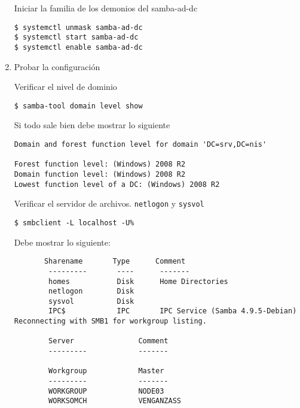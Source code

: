 \documentclass[../main.tex]{subfiles}
\begin{document}
\begin{enumerate}
        Iniciar la familia de los demonios del samba-ad-dc
        \begin{listing}[H]
\begin{verbatim}
$ systemctl unmask samba-ad-dc
$ systemctl start samba-ad-dc
$ systemctl enable samba-ad-dc
\end{verbatim}
\end{listing}


  \item Probar la configuración

        Verificar el nivel de dominio
        \begin{listing}[H]
\begin{verbatim}
$ samba-tool domain level show
\end{verbatim}
\end{listing}

        Si todo sale bien debe mostrar lo siguiente
        \begin{listing}[H]
\begin{verbatim}
Domain and forest function level for domain 'DC=srv,DC=nis'

Forest function level: (Windows) 2008 R2
Domain function level: (Windows) 2008 R2
Lowest function level of a DC: (Windows) 2008 R2
\end{verbatim}
\end{listing}

        Verificar el servidor de archivos. \texttt{netlogon}
        y \texttt{sysvol}
        \begin{listing}[H]
\begin{verbatim}
$ smbclient -L localhost -U%
\end{verbatim}
\end{listing}

        Debe mostrar lo siguiente:
        \begin{listing}[H]
\begin{verbatim}
       Sharename       Type      Comment
        ---------       ----      -------
        homes           Disk      Home Directories
        netlogon        Disk
        sysvol          Disk
        IPC$            IPC       IPC Service (Samba 4.9.5-Debian)
Reconnecting with SMB1 for workgroup listing.

        Server               Comment
        ---------            -------

        Workgroup            Master
        ---------            -------
        WORKGROUP            NODE03
        WORKSOMCH            VENGANZASS
\end{verbatim}
\end{listing}


\end{enumerate}
\end{document}
